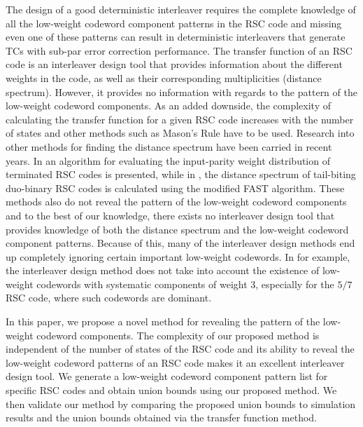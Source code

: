 The design of a good deterministic interleaver requires the complete knowledge of all the low-weight codeword component patterns in the RSC code and missing even one of these patterns can result in deterministic interleavers that generate TCs with sub-par error correction performance.
The transfer function of an RSC code is an interleaver design tool that provides information about the different weights in the code, as well as their corresponding multiplicities (distance spectrum). 
However, it provides no information with regards to the pattern of the low-weight codeword components. As an added downside, the complexity of calculating the transfer function for a given RSC code increases with the number of states and other methods such as Mason's Rule \cite{ref3} have to be used. Research into other methods for finding the distance spectrum have been carried in recent years.  In \cite{ref8} an algorithm for evaluating the input-parity weight distribution of
terminated RSC codes is presented, while in \cite{ref9}, the distance spectrum of tail-biting duo-binary
RSC codes is calculated using the modified FAST algorithm. These methods also do not reveal the pattern of the low-weight codeword components and to the best of our knowledge, there exists no interleaver design tool that provides knowledge of both the distance spectrum and the low-weight codeword component patterns. Because of this, many of the interleaver design methods end up completely ignoring certain important low-weight codewords. In \cite{ref5} for example, the interleaver design method does not take into account the existence of low-weight codewords with systematic components of weight 3, especially for the $5/7$  RSC code, where such codewords are dominant.

In this paper, we propose a novel method for revealing the pattern of the low-weight codeword components. The complexity of our proposed method is independent of the number of states of the RSC code and its ability to reveal the low-weight codeword patterns of an RSC code makes it an excellent interleaver design tool.
We generate a low-weight codeword component pattern list for specific RSC codes and obtain union bounds using our proposed method. We then validate our method by comparing the proposed union bounds to simulation results and the union bounds obtained via the transfer function method.

